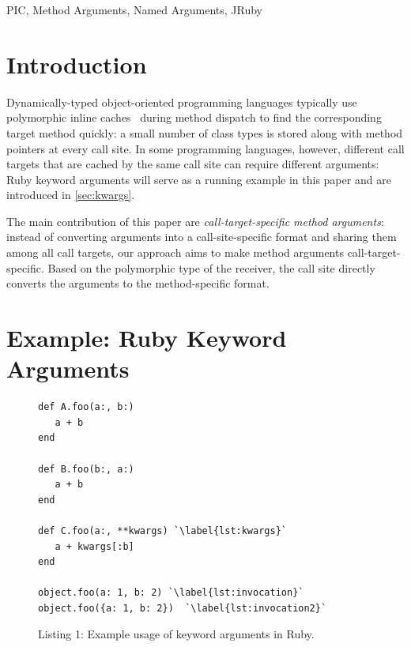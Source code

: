 \documentclass[10pt]{sigplanconf}
\begin{document}

\keywords
PIC, Method Arguments, Named Arguments, JRuby %

\section{Introduction}
Dynamically-typed object-oriented programming languages typically use polymorphic inline caches~\cite{Holzle:1991:ODO:646149.679193} during method dispatch to find the corresponding target method quickly: a small number of class types is stored along with method pointers at every call site. In some programming languages, however, different call targets that are cached by the same call site can require different arguments: Ruby keyword arguments will serve as a running example in this paper and are introduced in \autoref{sec:kwargs}. 

The main contribution of this paper are \emph{call-target-specific method arguments}: instead of converting arguments into a call-site-specific format and sharing them among all call targets, our approach aims to make method arguments call-target-specific. Based on the polymorphic type of the receiver, the call site directly converts the arguments to the method-specific format.

\section{Example: Ruby Keyword Arguments}
\label{sec:kwargs}
\setlength{\belowcaptionskip}{-10pt}
\begin{figure}[!bp] %
\begin{lstlisting}[basicstyle=\footnotesize\ttfamily] 
def A.foo(a:, b:)
   a + b
end

def B.foo(b:, a:)
   a + b
end

def C.foo(a:, **kwargs) `\label{lst:kwargs}`
   a + kwargs[:b]
end

object.foo(a: 1, b: 2) `\label{lst:invocation}`
object.foo({a: 1, b: 2})  `\label{lst:invocation2}`
\end{lstlisting}
\vspace{-0.25cm}
\caption*{Listing 1: Example usage of keyword arguments in Ruby.}
\end{figure}
\setlength{\belowcaptionskip}{0pt}
\end{document}
